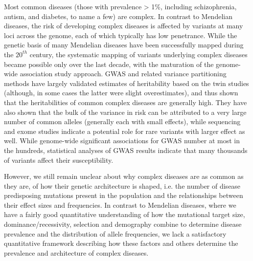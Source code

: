 \message{ !name(ResearchStrategy.tex)}\documentclass[11pt]{article}
\newcommand{\jb}[1]{{\color{blue} (#1)} }
\begin{document}
Most common diseases (those with prevalence > 1\%, including schizophrenia, autism, and diabetes, to name a few) are complex. In contrast to Mendelian diseases, the risk of developing complex diseases is affected by variants at many loci across the genome, each of which typically has low penetrance. While the genetic basis of many Mendelian diseases have been successfully mapped during the $20^{th}$ century, the systematic mapping of variants underlying complex diseases became possible only over the last decade, with the maturation of the genome-wide association study approach.\cite{Risch:1996ub,Visscher:2012je} GWAS and related variance partitioning methods have largely validated estimates of heritability based on the twin studies (although, in some cases the latter were slight overestimates), and thus shown that the heritabilities of common complex diseases are generally high. They have also shown that the bulk of the variance in risk can be attributed to a very large number of common
alleles (generally each with small effects),\cite{Consortium:2009ef,Lee:2012iu,Loh:2015hz,Ripke:2014eb,Lee:2012iu} while sequencing and exome studies indicate a potential role for rare variants with larger effect as well.\cite{Richards:2016cs, Genovese:2016fv, Purcell:2014gw} While genome-wide significant associations for GWAS number at most in the hundreds, statistical analyses of GWAS results indicate that many thousands of variants affect their susceptibility\cite{Yang:2010kn,Shi:2016bn}.

However, we still remain unclear about why complex diseases are as common as they are, of how their genetic architecture is shaped, i.e. the number of disease predisposing mutations present in the population and the relationships between their effect sizes and frequencies. In contrast to Mendelian diseases, where we have a fairly good quantitative understanding of how the mutational target size, dominance/recessivity, selection and demography combine to determine disease prevalence and the distribution of allele frequencies\cite{GuerraAmorim:2016hh}, we lack a satisfactory quantitative framework describing how these factors and others determine the prevalence and architecture of complex diseases. 



\end{document}
